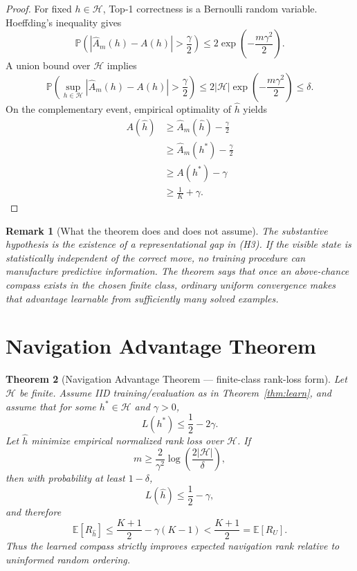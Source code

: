 \documentclass[11pt]{article}
\newtheorem{theorem}{Theorem}[section]
\newtheorem{remark}[theorem]{Remark}
\newcommand{\Prob}{\mathbb{P}}
\newcommand{\E}{\mathbb{E}}
\newcommand{\Hcal}{\mathcal{H}}
\begin{document}
\begin{proof}
For fixed $h\in\Hcal$, Top-1 correctness is a Bernoulli random variable. Hoeffding's inequality gives
\[
\Prob\!\left(\left|\widehat A_m(h)-A(h)\right|>\frac\gamma2\right)
\le 2\exp\!\left(-\frac{m\gamma^2}{2}\right).
\]
A union bound over $\Hcal$ implies
\[
\Prob\!\left(\sup_{h\in\Hcal}\left|\widehat A_m(h)-A(h)\right|>\frac\gamma2\right)
\le 2|\Hcal|\exp\!\left(-\frac{m\gamma^2}{2}\right)\le\delta.
\]
On the complementary event, empirical optimality of $\widehat h$ yields
\begin{align*}
A(\widehat h)
&\ge \widehat A_m(\widehat h)-\frac\gamma2\\
&\ge \widehat A_m(h^*)-\frac\gamma2\\
&\ge A(h^*)-\gamma\\
&\ge \frac1K+\gamma.
\end{align*}
\end{proof}

\begin{remark}[What the theorem does and does not assume]
The substantive hypothesis is the existence of a representational gap in (H3). If the visible state is statistically independent of the correct move, no training procedure can manufacture predictive information. The theorem says that once an above-chance compass exists in the chosen finite class, ordinary uniform convergence makes that advantage learnable from sufficiently many solved examples.
\end{remark}

\section{Navigation Advantage Theorem}

\begin{theorem}[Navigation Advantage Theorem --- finite-class rank-loss form]
\label{thm:navigation}
Let $\Hcal$ be finite. Assume IID training/evaluation as in Theorem~\ref{thm:learn}, and assume that for some $h^*\in\Hcal$ and $\gamma>0$,
\[
L(h^*)\le \frac12-2\gamma.
\]
Let $\widehat h$ minimize empirical normalized rank loss over $\Hcal$. If
\[
m\ge \frac{2}{\gamma^2}\log\!\left(\frac{2|\Hcal|}{\delta}\right),
\]
then with probability at least $1-\delta$,
\[
L(\widehat h)\le\frac12-\gamma,
\]
and therefore
\[
\E[R_{\widehat h}]
\le \frac{K+1}{2}-\gamma(K-1)
<\frac{K+1}{2}=\E[R_U].
\]
Thus the learned compass strictly improves expected navigation rank relative to uninformed random ordering.
\end{theorem}
\end{document}
